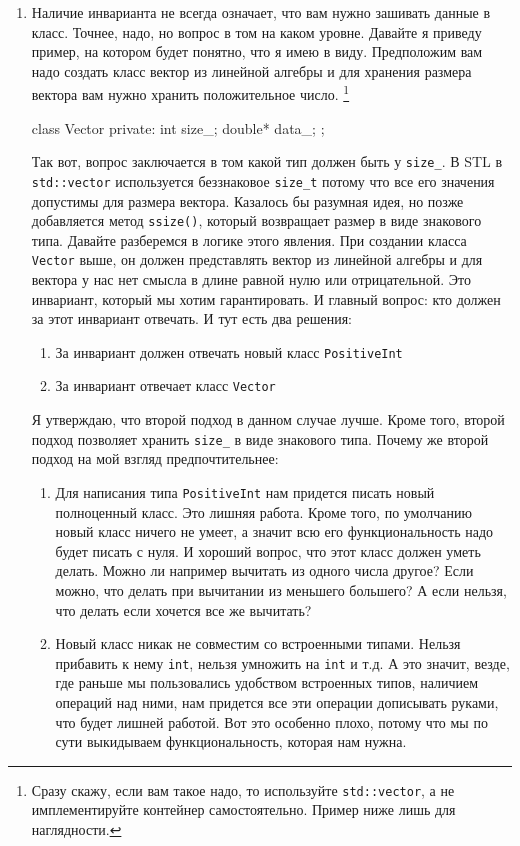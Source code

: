 \begin{enumerate}
\item Наличие инварианта не всегда означает, что вам нужно зашивать данные в класс.
Точнее, надо, но вопрос в том на каком уровне.
Давайте я приведу пример, на котором будет понятно, что я имею в виду.
Предположим вам надо создать класс вектор из линейной алгебры и для хранения размера вектора вам нужно хранить положительное число.%
\footnote{Сразу скажу, если вам такое надо, то используйте \verb"std::vector", а не имплементируйте контейнер самостоятельно.
Пример ниже лишь для наглядности.}
\begin{cppcode}
class Vector {
private:
  int size_;
  double* data_;
};
\end{cppcode}
Так вот, вопрос заключается в том какой тип должен быть у \verb"size_".
В STL в \verb"std::vector" используется беззнаковое \verb"size_t" потому что все его значения допустимы для размера вектора.
Казалось бы разумная идея, но позже добавляется метод \verb"ssize()", который возвращает размер в виде знакового типа.
Давайте разберемся в логике этого явления.
При создании класса \verb"Vector" выше, он должен представлять вектор из линейной алгебры и для вектора у нас нет смысла в длине равной нулю или отрицательной.
Это инвариант, который мы хотим гарантировать.
И главный вопрос: кто должен за этот инвариант отвечать.
И тут есть два решения:
\begin{enumerate}
\item За инвариант должен отвечать новый класс \verb"PositiveInt"

\item За инвариант отвечает класс \verb"Vector"
\end{enumerate}
Я утверждаю, что второй подход в данном случае лучше.
Кроме того, второй подход позволяет хранить \verb"size_" в виде знакового типа.
Почему же второй подход на мой взгляд предпочтительнее:
\begin{enumerate}
\item Для написания типа \verb"PositiveInt" нам придется писать новый полноценный класс.
Это лишняя работа.
Кроме того, по умолчанию новый класс ничего не умеет, а значит всю его функциональность надо будет писать с нуля.
И хороший вопрос, что этот класс должен уметь делать.
Можно ли например вычитать из одного числа другое?
Если можно, что делать при вычитании из меньшего большего?
А если нельзя, что делать если хочется все же вычитать?

\item Новый класс никак не совместим со встроенными типами.
Нельзя прибавить к нему \verb"int", нельзя умножить на \verb"int" и т.д.
А это значит, везде, где раньше мы пользовались удобством встроенных типов, наличием операций над ними, нам придется все эти операции дописывать руками, что будет лишней работой.
Вот это особенно плохо, потому что мы по сути выкидываем функциональность, которая нам нужна.


\end{enumerate}
\end{enumerate}

